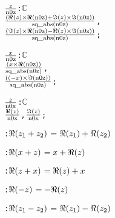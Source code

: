 \begin{alltt}
  \(\opdividetwofn{z}{\pvsid{n0z}}\): \(\mathbb{C}\) \pvskey{=}
      \pvsid{(}\(\opdividetwofn{\pvsid{(}\opplustwofn{\optimestwofn{\Reonefn{z}}{\Reonefn{\pvsid{n0z}}}}{\optimestwofn{\Imonefn{z}}{\Imonefn{\pvsid{n0z}}}}\pvsid{)}}{\pvsid{sq\_abs}\pvsid{(}\pvsid{n0z}\pvsid{)}}\),
                \(\opdividetwofn{\pvsid{(}\opdifferencetwofn{\optimestwofn{\Imonefn{z}}{\Reonefn{\pvsid{n0z}}}}{\optimestwofn{\Reonefn{z}}{\Imonefn{\pvsid{n0z}}}}\pvsid{)}}{\pvsid{sq\_abs}\pvsid{(}\pvsid{n0z}\pvsid{)}}\)\pvsid{)};\vspace*{\pvsdeclspacing}

  \(\opdividetwofn{x}{\pvsid{n0z}}\): \(\mathbb{C}\) \pvskey{=}
      \pvsid{(}\(\opdividetwofn{\pvsid{(}\optimestwofn{x}{\Reonefn{\pvsid{n0z}}}\pvsid{)}}{\pvsid{sq\_abs}\pvsid{(}\pvsid{n0z}\pvsid{)}}\),
                \(\opdividetwofn{\pvsid{(}\optimestwofn{\pvsid{(}\opdifferenceonefn{x}\pvsid{)}}{\Imonefn{\pvsid{n0z}}}\pvsid{)}}{\pvsid{sq\_abs}\pvsid{(}\pvsid{n0z}\pvsid{)}}\)\pvsid{)};\vspace*{\pvsdeclspacing}

  \(\opdividetwofn{z}{\pvsid{n0x}}\): \(\mathbb{C}\) \pvskey{=}
      \pvsid{(}\(\opdividetwofn{\Reonefn{z}}{\pvsid{n0x}}\), \(\opdividetwofn{\Imonefn{z}}{\pvsid{n0x}}\)\pvsid{)};\vspace*{\pvsdeclspacing}

  :  \(\Reonefn{\opplustwofn{z\sb{1}}{z\sb{2}}}\) \(=\) \(\opplustwofn{\Reonefn{z\sb{1}}}{\Reonefn{z\sb{2}}}\)\vspace*{\pvsdeclspacing}

  :  \(\Reonefn{\opplustwofn{x}{z}}\) \(=\) \(\opplustwofn{x}{\Reonefn{z}}\)\vspace*{\pvsdeclspacing}

  :  \(\Reonefn{\opplustwofn{z}{x}}\) \(=\) \(\opplustwofn{\Reonefn{z}}{x}\)\vspace*{\pvsdeclspacing}

  :  \(\Reonefn{\opdifferenceonefn{z}}\) \(=\) \(\opdifferenceonefn{\Reonefn{z}}\)\vspace*{\pvsdeclspacing}

  :  \(\Reonefn{\opdifferencetwofn{z\sb{1}}{z\sb{2}}}\) \(=\) \(\opdifferencetwofn{\Reonefn{z\sb{1}}}{\Reonefn{z\sb{2}}}\)\vspace*{\pvsdeclspacing}


\end{alltt}
